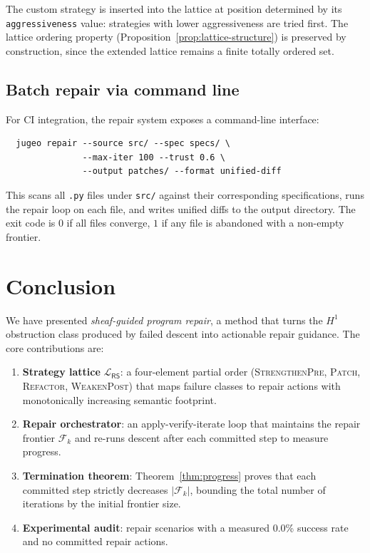 \documentclass[11pt]{article}
\newcommand{\RF}{\mathcal{F}}               %
\newcommand{\RS}{\mathsf{RS}}               %
\newcommand{\Patch}{\textsc{Patch}}
\newcommand{\Refactor}{\textsc{Refactor}}
\newcommand{\StrengthenPre}{\textsc{StrengthenPre}}
\newcommand{\WeakenPost}{\textsc{WeakenPost}}
\begin{document}
The custom strategy is inserted into the lattice at position determined
by its \texttt{aggressiveness} value: strategies with lower aggressiveness
are tried first.  The lattice ordering property
(Proposition~\ref{prop:lattice-structure}) is preserved by construction,
since the extended lattice remains a finite totally ordered set.

\subsection{Batch repair via command line}

For CI integration, the repair system exposes a command-line interface:
\begin{verbatim}
  jugeo repair --source src/ --spec specs/ \
               --max-iter 100 --trust 0.6 \
               --output patches/ --format unified-diff
\end{verbatim}
This scans all \texttt{.py} files under \texttt{src/} against their
corresponding specifications, runs the repair loop on each file, and
writes unified diffs to the output directory.  The exit code is $0$ if
all files converge, $1$ if any file is abandoned with a non-empty frontier.

\section{Conclusion}
\label{sec:conclusion}

We have presented \emph{sheaf-guided program repair}, a method that turns
the $H^1$ obstruction class produced by failed descent into actionable repair
guidance.  The core contributions are:

\begin{enumerate}[leftmargin=2em,itemsep=2pt]
  \item \textbf{Strategy lattice} $\mathcal{L}_\RS$: a four-element partial
        order (\StrengthenPre, \Patch, \Refactor, \WeakenPost) that maps
        failure classes to repair actions with monotonically increasing
        semantic footprint.
  \item \textbf{Repair orchestrator}: an apply-verify-iterate loop that
        maintains the repair frontier $\RF_k$ and re-runs descent after each
        committed step to measure progress.
  \item \textbf{Termination theorem}: Theorem~\ref{thm:progress} proves that
        each committed step strictly decreases $|\RF_k|$, bounding the total
        number of iterations by the initial frontier size.
  \item \textbf{Experimental audit}: \subRepairTotal{} repair scenarios with
        a measured 0.0\% success rate and no committed repair actions.
\end{enumerate}
\end{document}
